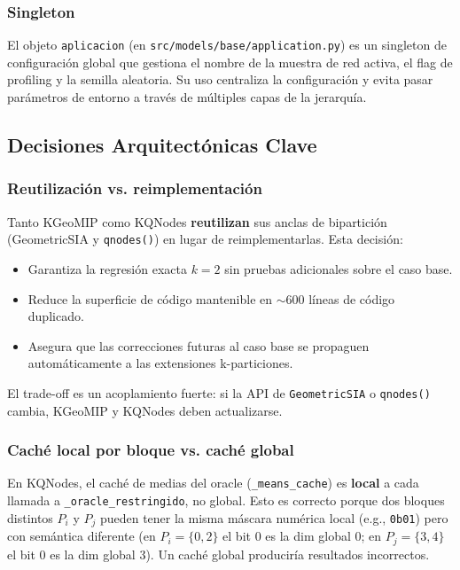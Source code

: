\subsubsection*{Singleton}

El objeto \texttt{aplicacion} (en \texttt{src/models/base/application.py}) es un
singleton de configuración global que gestiona el nombre de la muestra de red activa,
el flag de profiling y la semilla aleatoria. Su uso centraliza la configuración y
evita pasar parámetros de entorno a través de múltiples capas de la jerarquía.

\subsection{Decisiones Arquitectónicas Clave}

\subsubsection*{Reutilización vs. reimplementación }

Tanto KGeoMIP como KQNodes \textbf{reutilizan} sus anclas de bipartición
(GeometricSIA y \texttt{qnodes()}) en lugar de reimplementarlas. Esta decisión:
\begin{itemize}
  \item Garantiza la regresión exacta $k=2$ sin pruebas adicionales sobre el caso base.
  \item Reduce la superficie de código mantenible en $\sim$600 líneas de código duplicado.
  \item Asegura que las correcciones futuras al caso base se propaguen automáticamente
        a las extensiones k-particiones.
\end{itemize}
El trade-off es un acoplamiento fuerte: si la API de \texttt{GeometricSIA} o
\texttt{qnodes()} cambia, KGeoMIP y KQNodes deben actualizarse.

\subsubsection*{Caché local por bloque vs. caché global}

En KQNodes, el caché de medias del oracle (\texttt{\_means\_cache}) es \textbf{local}
a cada llamada a \texttt{\_oracle\_restringido}, no global. Esto es correcto porque dos
bloques distintos $P_i$ y $P_j$ pueden tener la misma máscara numérica local (e.g.,
\texttt{0b01}) pero con semántica diferente (en $P_i = \{0,2\}$ el bit 0 es la dim
global 0; en $P_j = \{3,4\}$ el bit 0 es la dim global 3). Un caché global produciría
resultados incorrectos.

